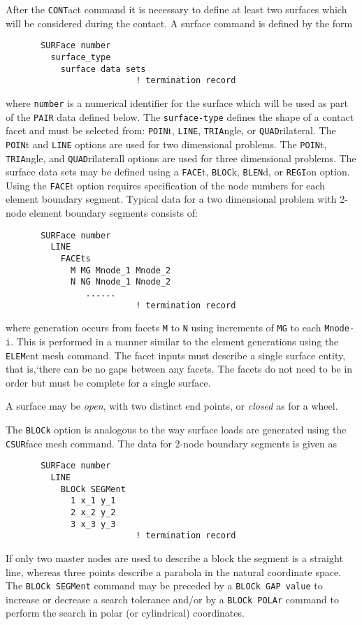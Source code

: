 After the {\tt CONT}act command it is necessary to define at least two
surfaces which will be considered during the contact.  A surface command
is defined by the form
\begin{verbatim}
       SURFace number
         surface_type
           surface data sets
                          ! termination record
\end{verbatim} 
where {\tt number} is a numerical identifier for the surface which will
be used as part of the {\tt PAIR} data defined below.  The
{\tt surface-type} defines the shape of a contact facet and must be
selected from: {\tt POIN}t, {\tt LINE}, {\tt TRIA}ngle, or
{\tt QUAD}rilateral.  The {\tt POIN}t and {\tt LINE} options are used
for two dimensional problems.  The {\tt POIN}t, {\tt TRIA}ngle, and
{\tt QUAD}rilaterall options are used for three dimensional problems.
The surface data sets may be defined using a {\tt FACE}t, {\tt BLOC}k,
{\tt BLEN}d, or {\tt REGI}on option.  Using the {\tt FACE}t option
requires specification of the node numbers for each element boundary segment.
Typical data for a two dimensional problem with 2-node element boundary
segments consists of:
\begin{verbatim}
       SURFace number
         LINE
           FACEts
             M MG Mnode_1 Mnode_2
             N NG Nnode_1 Nnode_2
                ......
                          ! termination record
\end{verbatim} 
where generation occurs from facets {\tt M} to {\tt N} using increments
of {\tt MG} to each {\tt Mnode-i}.  This is performed in a manner similar
to the element generations using the {\tt ELEM}ent mesh command.
The facet inputs must describe a single surface entity, that is,`there can be
no gaps between any facets.  The facets do not need to be in order but
must be complete for a single surface.

A surface may be {\it open}, with two distinct end points, or {\it closed}
as for a wheel.

The {\tt BLOCk} option is analogous to the way surface loads are generated
using the {\tt CSUR}face mesh command.  The data for 2-node boundary segments
is given as
\begin{verbatim}
       SURFace number
         LINE
           BLOCk SEGMent
             1 x_1 y_1
             2 x_2 y_2
             3 x_3 y_3
                          ! termination record
\end{verbatim} 
If only two master nodes are used to describe a block the segment is
a straight line, whereas three points describe a parabola in the natural
coordinate space.  The {\tt BLOCk SEGMent} command may be preceded by
a {\tt BLOCk GAP value} to increase or decrease a search tolerance and/or by
a {\tt BLOCk POLAr} command to perform the search in polar (or cylindrical)
coordinates.

